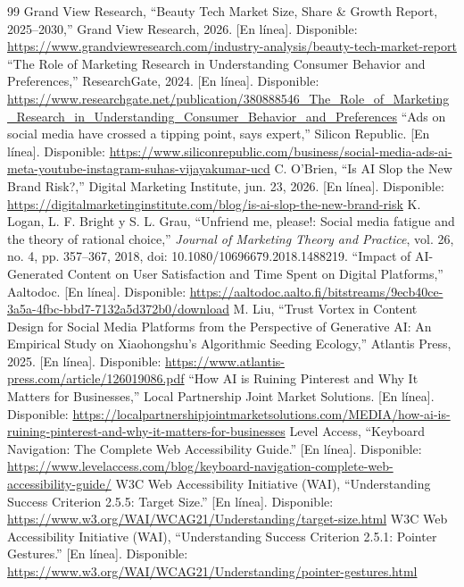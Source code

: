 \documentclass[conference]{IEEEtran}
\begin{document}
\begin{thebibliography}{99}
 Grand View Research, ``Beauty Tech Market Size, Share \& Growth Report, 2025--2030,'' Grand View Research, 2026. [En línea]. Disponible: \url{https://www.grandviewresearch.com/industry-analysis/beauty-tech-market-report}
 ``The Role of Marketing Research in Understanding Consumer Behavior and Preferences,'' ResearchGate, 2024. [En línea]. Disponible: \url{https://www.researchgate.net/publication/380888546_The_Role_of_Marketing_Research_in_Understanding_Consumer_Behavior_and_Preferences}
 ``Ads on social media have crossed a tipping point, says expert,'' Silicon Republic. [En línea]. Disponible: \url{https://www.siliconrepublic.com/business/social-media-ads-ai-meta-youtube-instagram-suhas-vijayakumar-ucd}
 C. O'Brien, ``Is AI Slop the New Brand Risk?,'' Digital Marketing Institute, jun. 23, 2026. [En línea]. Disponible: \url{https://digitalmarketinginstitute.com/blog/is-ai-slop-the-new-brand-risk}
 K. Logan, L. F. Bright y S. L. Grau, ``Unfriend me, please!: Social media fatigue and the theory of rational choice,'' \textit{Journal of Marketing Theory and Practice}, vol. 26, no. 4, pp. 357--367, 2018, doi: 10.1080/10696679.2018.1488219.
 ``Impact of AI-Generated Content on User Satisfaction and Time Spent on Digital Platforms,'' Aaltodoc. [En línea]. Disponible: \url{https://aaltodoc.aalto.fi/bitstreams/9ecb40ce-3a5a-4fbc-bbd7-7132a5d372b0/download}
 M. Liu, ``Trust Vortex in Content Design for Social Media Platforms from the Perspective of Generative AI: An Empirical Study on Xiaohongshu's Algorithmic Seeding Ecology,'' Atlantis Press, 2025. [En línea]. Disponible: \url{https://www.atlantis-press.com/article/126019086.pdf}
 ``How AI is Ruining Pinterest and Why It Matters for Businesses,'' Local Partnership Joint Market Solutions. [En línea]. Disponible: \url{https://localpartnershipjointmarketsolutions.com/MEDIA/how-ai-is-ruining-pinterest-and-why-it-matters-for-businesses}
 Level Access, ``Keyboard Navigation: The Complete Web Accessibility Guide.'' [En línea]. Disponible: \url{https://www.levelaccess.com/blog/keyboard-navigation-complete-web-accessibility-guide/}
 W3C Web Accessibility Initiative (WAI), ``Understanding Success Criterion 2.5.5: Target Size.'' [En línea]. Disponible: \url{https://www.w3.org/WAI/WCAG21/Understanding/target-size.html}
 W3C Web Accessibility Initiative (WAI), ``Understanding Success Criterion 2.5.1: Pointer Gestures.'' [En línea]. Disponible: \url{https://www.w3.org/WAI/WCAG21/Understanding/pointer-gestures.html}

\end{thebibliography}
\end{document}
